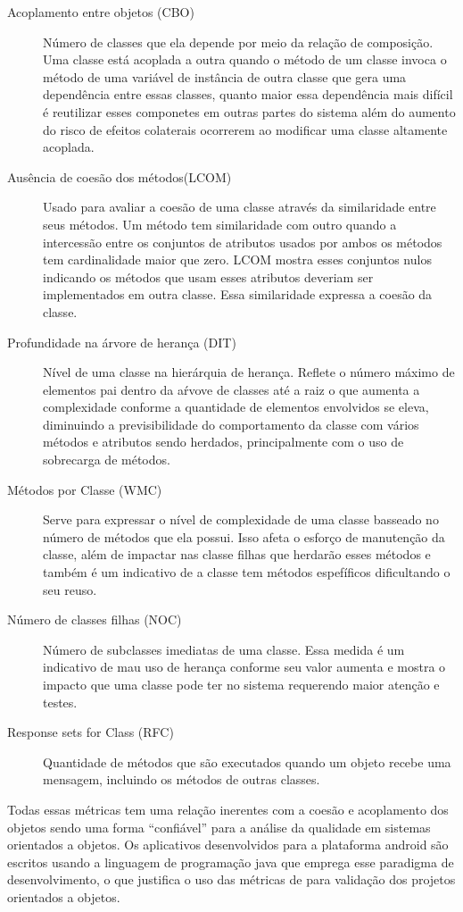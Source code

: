 \begin{description}
\item[Acoplamento entre objetos (CBO)] Número de classes que ela depende por
meio da relação de composição. Uma classe está acoplada a outra quando o método
de um classe invoca o método de uma variável de instância de outra classe que
gera uma dependência entre essas classes, quanto maior essa dependência mais
difícil é reutilizar esses componetes em outras partes do sistema além do
aumento do risco de efeitos colaterais ocorrerem ao modificar uma classe
altamente acoplada.
\item[Ausência de coesão dos métodos(LCOM)] Usado para avaliar a coesão de uma
classe através da similaridade entre seus métodos. Um método tem similaridade
com outro quando a intercessão entre os conjuntos de atributos usados por ambos
os métodos tem cardinalidade maior que zero. LCOM mostra esses conjuntos nulos
indicando os métodos que usam esses atributos deveriam ser implementados em
outra classe. Essa similaridade expressa a coesão da classe.
\item[Profundidade na árvore de herança (DIT)] Nível de uma classe na
hierárquia de herança. Reflete o número máximo de elementos pai dentro da aŕvove
de classes até a raiz o que aumenta a complexidade conforme a quantidade de
elementos envolvidos se eleva, diminuindo a previsibilidade do comportamento da
classe com vários métodos e atributos sendo herdados, principalmente com o uso
de sobrecarga de métodos.
\item[Métodos por Classe (WMC)] Serve para expressar o nível de complexidade de
uma classe basseado no número de métodos que ela possui. Isso afeta o esforço de
manutenção da classe, além de impactar nas classe filhas que herdarão esses
métodos e também é um indicativo de a classe tem métodos espefíficos
dificultando o seu reuso.
\item[Número de classes filhas (NOC)] Número de subclasses imediatas de uma
classe. Essa medida é um indicativo de mau uso de herança conforme seu valor
aumenta e mostra o impacto que uma classe pode ter no sistema requerendo maior
atenção e testes.
\item[Response sets for Class (RFC)] Quantidade de métodos que são executados
quando um objeto recebe uma mensagem, incluindo os métodos de outras classes. 
\end{description}

Todas essas métricas tem uma relação inerentes com a coesão e acoplamento dos
objetos sendo uma forma ``confiável'' para a análise da qualidade em sistemas
orientados a objetos. Os aplicativos desenvolvidos para a plataforma android são
escritos usando a linguagem de programação java que emprega esse paradigma de
desenvolvimento, o que justifica o uso das métricas de  para
validação dos projetos orientados a objetos.



